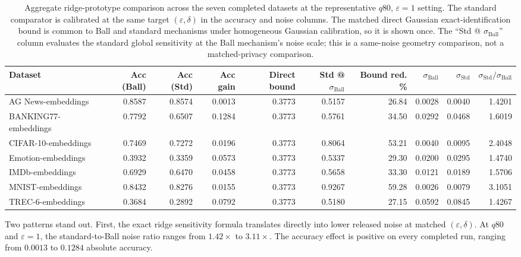 \documentclass[conference,compsoc]{IEEEtran}
\begin{document}
\begin{table}[t]
\centering
\caption{Aggregate ridge-prototype comparison across the seven completed datasets at the representative $q80$, $\varepsilon=1$ setting. The standard comparator is calibrated at the same target $(\varepsilon,\delta)$ in the accuracy and noise columns. The matched direct Gaussian exact-identification bound is common to Ball and standard mechanisms under homogeneous Gaussian calibration, so it is shown once. The ``Std @ $\sigma_{\mathrm{Ball}}$'' column evaluates the standard global sensitivity at the Ball mechanism's noise scale; this is a same-noise geometry comparison, not a matched-privacy comparison.}
\label{tab:aggregate-summary}
\scriptsize
\setlength{\tabcolsep}{3.5pt}
\begin{tabular}{lrrrrrrrrr}
\toprule
Dataset
& Acc (Ball)
& Acc (Std)
& Acc gain
& Direct bound
& Std @ $\sigma_{\mathrm{Ball}}$
& Bound red. \%
& $\sigma_{\mathrm{Ball}}$
& $\sigma_{\mathrm{Std}}$
& $\sigma_{\mathrm{Std}}/\sigma_{\mathrm{Ball}}$ \\
\midrule
AG News-embeddings          & 0.8587 & 0.8574 & 0.0013 & 0.3773 & 0.5157 & 26.84 & 0.0028 & 0.0040 & 1.4201 \\
BANKING77-embeddings        & 0.7792 & 0.6507 & 0.1284 & 0.3773 & 0.5761 & 34.50 & 0.0292 & 0.0468 & 1.6019 \\
CIFAR-10-embeddings         & 0.7469 & 0.7272 & 0.0196 & 0.3773 & 0.8064 & 53.21 & 0.0040 & 0.0095 & 2.4048 \\
Emotion-embeddings          & 0.3932 & 0.3359 & 0.0573 & 0.3773 & 0.5337 & 29.30 & 0.0200 & 0.0295 & 1.4740 \\
IMDb-embeddings             & 0.6929 & 0.6470 & 0.0458 & 0.3773 & 0.5658 & 33.30 & 0.0121 & 0.0189 & 1.5706 \\
MNIST-embeddings            & 0.8432 & 0.8276 & 0.0155 & 0.3773 & 0.9267 & 59.28 & 0.0026 & 0.0079 & 3.1051 \\
TREC-6-embeddings           & 0.3684 & 0.2892 & 0.0792 & 0.3773 & 0.5180 & 27.15 & 0.0592 & 0.0845 & 1.4267 \\
\bottomrule
\end{tabular}
\end{table}

Two patterns stand out. First, the exact ridge sensitivity formula translates directly into lower released noise at matched $(\varepsilon,\delta)$. At $q80$ and $\varepsilon=1$, the standard-to-Ball noise ratio ranges from $1.42\times$ to $3.11\times$. The accuracy effect is positive on every completed run, ranging from $0.0013$ to $0.1284$ absolute accuracy.
\end{document}
